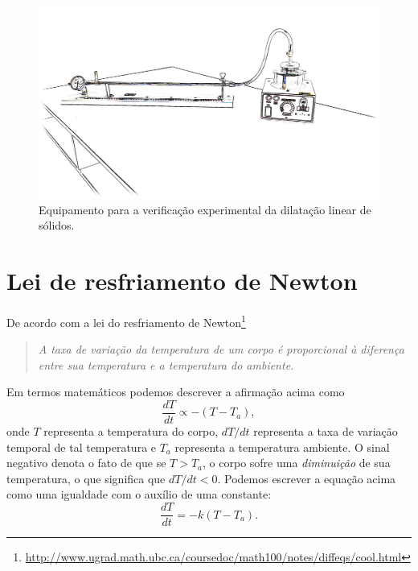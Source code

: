 \begin{figure}
\centering
\forceversofloat
\includegraphics[width=\textwidth]{Ilustrations/Dilatacao.png}
\caption{Equipamento para a verificação experimental da dilatação linear de sólidos.}
\end{figure}
\section{Lei de resfriamento de Newton}

De acordo com a lei do resfriamento de Newton\footnote{\url{http://www.ugrad.math.ubc.ca/coursedoc/math100/notes/diffeqs/cool.html}}
\begin{quote}\it
	A taxa de variação da temperatura de um corpo é proporcional à diferença entre sua temperatura e a temperatura do ambiente.
\end{quote}
%
Em termos matemáticos podemos descrever a afirmação acima como
\begin{equation}
	\frac{dT}{dt} \propto -(T - T_a),
\end{equation}
%
onde $T$ representa a temperatura do corpo, $dT/dt$ representa a taxa de variação temporal de tal temperatura e $T_a$ representa a temperatura ambiente. O sinal negativo denota o fato de que se $T > T_a$, o corpo sofre uma \emph{diminuição} de sua temperatura, o que significa que $dT/dt < 0$. Podemos escrever a equação acima como uma igualdade com o auxílio de uma constante:
\begin{equation}\label{Eq:VarTIgualKT}
	\frac{dT}{dt} = -k (T - T_a).
\end{equation}

